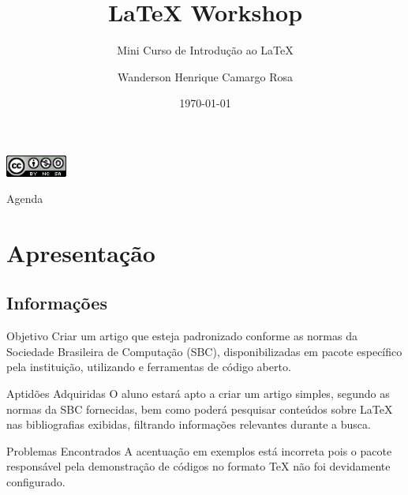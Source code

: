 \documentclass[hyperref={pdfpagelabels=false}]{beamer}
\title[\LaTeX{}]{\LaTeX{} Workshop}
\subtitle{Mini Curso de Introdução ao \LaTeX{}}
\author[CAMARGO]{Wanderson Henrique Camargo Rosa}
\institute[UNISINOS]{Universidade do Vale do Rio dos Sinos --- UNISINOS}
\date{\today{}}
\begin{document}
\begin{frame}
    \maketitle{}
    \begin{center}
        \includegraphics[width=20mm]{src/CC-BY-NC-SA-icon-88x31.png}
    \end{center}
\end{frame}

\begin{frame}{Agenda}
    \tableofcontents{}
\end{frame}

\section{Apresentação}
\label{sec:apresentacao}

\subsection{Informações}

\begin{frame}{Objetivo}
    Criar um artigo que esteja padronizado conforme as normas da Sociedade
    Brasileira de Computação (SBC), disponibilizadas em pacote específico pela
    instituição, utilizando \LaTeXe{} e ferramentas de código aberto.
\end{frame}

\begin{frame}{Aptidões Adquiridas}
    O aluno estará apto a criar um artigo simples, segundo as normas da SBC
    fornecidas, bem como poderá pesquisar conteúdos sobre \LaTeX{} nas
    bibliografias exibidas, filtrando informações relevantes durante a busca.
\end{frame}

\begin{frame}{Problemas Encontrados}
    A acentuação em exemplos está incorreta pois o pacote responsável pela
    demonstração de códigos no formato \TeX{} não foi devidamente configurado.
\end{frame}
\end{document}
